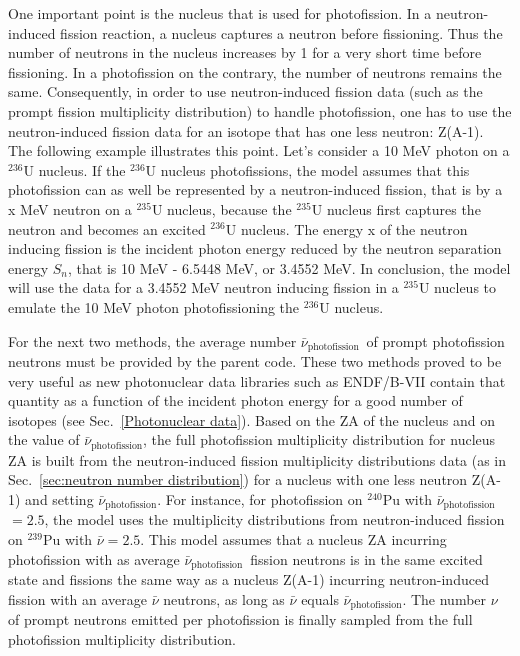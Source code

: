 One important point is the nucleus that is used for 
photofission. In a neutron-induced fission reaction, a nucleus 
captures a neutron before fissioning. Thus the number of 
neutrons in the nucleus increases by 1 for a very short time 
before fissioning. In a photofission on the contrary, the 
number of neutrons remains the same. Consequently, in order to 
use neutron-induced fission data (such as the prompt fission
multiplicity distribution) to handle photofission, one has to 
use the neutron-induced fission data for an isotope that has one 
less neutron: Z(A-1). The following example illustrates this 
point. Let's consider a 10 MeV photon on a $^{236}$U nucleus. If 
the $^{236}$U nucleus photofissions, the model assumes that this 
photofission can as well be represented by a neutron-induced 
fission, that is by a x MeV neutron on a $^{235}$U nucleus, 
because the $^{235}$U nucleus first captures the neutron and 
becomes an excited $^{236}$U nucleus. The energy x of the 
neutron inducing fission is the incident photon energy reduced 
by the neutron separation energy $S_n$, that is 
10 MeV - 6.5448 MeV, or 3.4552 MeV. In conclusion, the model will
use the data for a 3.4552 MeV neutron inducing fission in a 
$^{235}$U nucleus to emulate the 10 MeV photon photofissioning 
the $^{236}$U nucleus.

\newcommand{\nuphoto}{$\bar{\nu}_\mathrm{photofission}$}

For the next two methods, the 
average number \nuphoto\ of prompt photofission neutrons 
must be provided by the parent code. These two methods proved to 
be very useful as new photonuclear data libraries such as 
ENDF/B-VII contain that quantity as a function of the incident 
photon energy for a good number of isotopes (see 
Sec.~\ref{Photonuclear data}). Based on the ZA of the nucleus 
and on the value of \nuphoto,
the full photofission multiplicity distribution for nucleus ZA
is built from the neutron-induced fission multiplicity 
distributions data (as in
Sec.~\ref{sec:neutron number distribution}) for a nucleus with one 
less neutron Z(A-1) and setting \nuphoto. 
For instance, for photofission on $^{240}$Pu with 
\nuphoto$=2.5$, the model uses the multiplicity 
distributions from neutron-induced fission on $^{239}$Pu with 
$\bar{\nu}=2.5$. This model assumes that a nucleus ZA incurring 
photofission with as average \nuphoto\ fission 
neutrons is in the same excited state and fissions the same way as
a nucleus Z(A-1) incurring neutron-induced fission with an 
average $\bar{\nu}$ neutrons, as long as $\bar{\nu}$ equals
\nuphoto. The number $\nu$ of prompt neutrons 
emitted per photofission is finally sampled from the full 
photofission multiplicity distribution.

